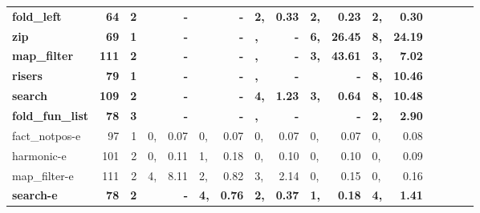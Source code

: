 \begin{table*}
\begin{center}
\begin{tabular}{|l|r|r|p{0pt}r|p{0pt}r|p{0pt}r|p{0pt}r|p{0pt}r|p{0pt}r|p{0pt}r|}
\bf fold\_left        & \bf   64 & \bf 2 & \bf    & \bf       -  & \bf    & \bf       -  & \bf  2,& \bf    0.33  & \bf  2,& \bf    0.23  & \bf  2,& \bf    0.30  \\
\bf zip               & \bf   69 & \bf 1 & \bf    & \bf       -  & \bf    & \bf       -  & \bf   ,& \bf        - & \bf  6,& \bf   26.45  & \bf  8,& \bf   24.19  \\
\bf map\_filter       & \bf  111 & \bf 2 & \bf    & \bf       -  & \bf    & \bf       -  & \bf   ,& \bf        - & \bf  3,& \bf   43.61  & \bf  3,& \bf    7.02  \\
\bf risers            & \bf   79 & \bf 1 & \bf    & \bf       -  & \bf    & \bf       -  & \bf   ,& \bf        - & \bf    & \bf       -  & \bf  8,& \bf   10.46  \\
\bf search            & \bf  109 & \bf 2 & \bf    & \bf       -  & \bf    & \bf       -  & \bf  4,& \bf    1.23  & \bf  3,& \bf    0.64  & \bf  8,& \bf   10.48  \\
\bf fold\_fun\_list   & \bf   78 & \bf 3 & \bf    & \bf       -  & \bf    & \bf       -  & \bf   ,& \bf        - & \bf    & \bf       -  & \bf  2,& \bf    2.90  \\
fact\_notpos-e    &   97 & 1 &  0,&    0.07  &  0,&    0.07  &  0,&    0.07  &  0,&    0.07  &  0,&    0.08  \\
harmonic-e        &  101 & 2 &  0,&    0.11  &  1,&    0.18  &  0,&    0.10  &  0,&    0.10  &  0,&    0.09  \\
map\_filter-e     &  111 & 2 &  4,&    8.11  &  2,&    0.82  &  3,&    2.14  &  0,&    0.15  &  0,&    0.16  \\
\bf search-e          & \bf   78 & \bf 2 & \bf    & \bf       -  & \bf  4,& \bf    0.76  & \bf  2,& \bf    0.37  & \bf  1,& \bf    0.18  & \bf  4,& \bf    1.41  \\
\hline
\end{tabular}
\end{center}
\end{table*}

